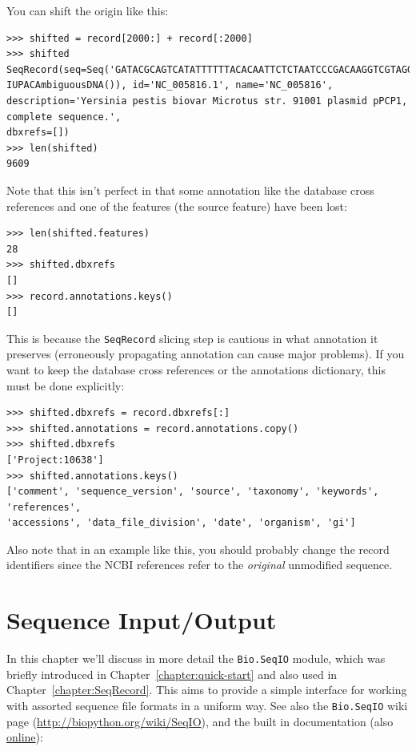 \documentclass{report}
\begin{document}
You can shift the origin like this:

\begin{verbatim}
>>> shifted = record[2000:] + record[:2000]
>>> shifted
SeqRecord(seq=Seq('GATACGCAGTCATATTTTTTACACAATTCTCTAATCCCGACAAGGTCGTAGGTC...GGA',
IUPACAmbiguousDNA()), id='NC_005816.1', name='NC_005816',
description='Yersinia pestis biovar Microtus str. 91001 plasmid pPCP1, complete sequence.',
dbxrefs=[])
>>> len(shifted)
9609
\end{verbatim}

Note that this isn't perfect in that some annotation like the database cross references
and one of the features (the source feature) have been lost:

\begin{verbatim}
>>> len(shifted.features)
28
>>> shifted.dbxrefs
[]
>>> record.annotations.keys()
[]
\end{verbatim}

This is because the \verb|SeqRecord| slicing step is cautious in what annotation
it preserves (erroneously propagating annotation can cause major problems). If
you want to keep the database cross references or the annotations dictionary,
this must be done explicitly:

\begin{verbatim}
>>> shifted.dbxrefs = record.dbxrefs[:]
>>> shifted.annotations = record.annotations.copy()
>>> shifted.dbxrefs
['Project:10638']
>>> shifted.annotations.keys()
['comment', 'sequence_version', 'source', 'taxonomy', 'keywords', 'references',
'accessions', 'data_file_division', 'date', 'organism', 'gi']
\end{verbatim}

Also note that in an example like this, you should probably change the record
identifiers since the NCBI references refer to the \emph{original} unmodified
sequence.

\chapter{Sequence Input/Output}
\label{chapter:Bio.SeqIO}

In this chapter we'll discuss in more detail the \verb|Bio.SeqIO| module, which was briefly introduced in Chapter~\ref{chapter:quick-start} and also used in Chapter~\ref{chapter:SeqRecord}. This aims to provide a simple interface for working with assorted sequence file formats in a uniform way.
See also the \verb|Bio.SeqIO| wiki page (\url{http://biopython.org/wiki/SeqIO}), and the built in documentation (also \href{http://biopython.org/DIST/docs/api/Bio.SeqIO-module.html}{online}):
\end{document}
